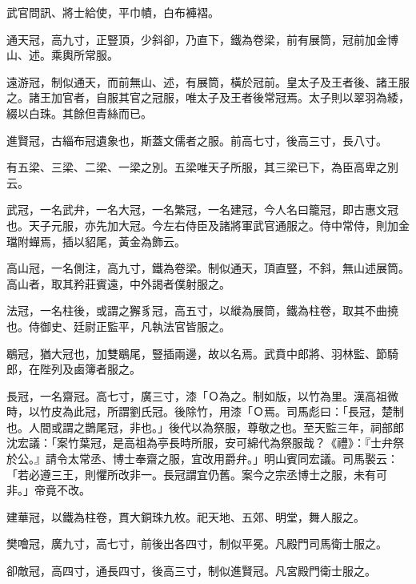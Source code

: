 \begin{pinyinscope}
 武官問訊、將士給使，平巾幘，白布褲褶。



 通天冠，高九寸，正豎頂，少斜卻，乃直下，鐵為卷梁，前有展筒，冠前加金博山、述。乘輿所常服。



 遠游冠，制似通天，而前無山、述，有展筒，橫於冠前。皇太子及王者後、諸王服之。諸王加官者，自服其官之冠服，唯太子及王者後常冠焉。太子則以翠羽為緌，綴以白珠。其餘但青絲而已。



 進賢冠，古緇布冠遺象也，斯蓋文儒者之服。前高七寸，後高三寸，長八寸。



 有五梁、三梁、二梁、一梁之別。五梁唯天子所服，其三梁已下，為臣高卑之別云。



 武冠，一名武弁，一名大冠，一名繁冠，一名建冠，今人名曰籠冠，即古惠文冠也。天子元服，亦先加大冠。今左右侍臣及諸將軍武官通服之。侍中常侍，則加金璫附蟬焉，插以貂尾，黃金為飾云。



 高山冠，一名側注，高九寸，鐵為卷梁。制似通天，頂直豎，不斜，無山述展筒。高山者，取其矜莊賓遠，中外謁者僕射服之。



 法冠，一名柱後，或謂之獬豸冠，高五寸，以縰為展筒，鐵為柱卷，取其不曲撓也。侍御史、廷尉正監平，凡執法官皆服之。



 鶡冠，猶大冠也，加雙鶡尾，豎插兩邊，故以名焉。武賁中郎將、羽林監、節騎郎，在陛列及鹵簿者服之。



 長冠，一名齋冠。高七寸，廣三寸，漆「Ｏ為之。制如版，以竹為里。漢高祖微時，以竹皮為此冠，所謂劉氏冠。後除竹，用漆「Ｏ焉。司馬彪曰：「長冠，楚制也。人間或謂之鵲尾冠，非也。」後代以為祭服，尊敬之也。至天監三年，祠部郎沈宏議：「案竹葉冠，是高祖為亭長時所服，安可綿代為祭服哉？《禮》：『士弁祭於公。』請令太常丞、博士奉齋之服，宜改用爵弁。」明山賓同宏議。司馬褧云：「若必遵三王，則懼所改非一。長冠謂宜仍舊。案今之宗丞博士之服，未有可
 非。」帝竟不改。



 建華冠，以鐵為柱卷，貫大銅珠九枚。祀天地、五郊、明堂，舞人服之。



 樊噲冠，廣九寸，高七寸，前後出各四寸，制似平冕。凡殿門司馬衛士服之。



 卻敵冠，高四寸，通長四寸，後高三寸，制似進賢冠。凡宮殿門衛士服之。




\end{pinyinscope}
